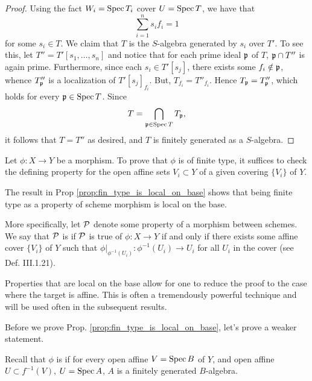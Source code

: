 \begin{proof}
Using the fact $W_i = \mathrm{Spec}\, T_i$ cover $U = \mathrm{Spec}\, T$, we have that
\[
\sum_{i = 1}^n s_if_i = 1
\]
for some $s_i \in T$. We claim that $T$ is the $S$-algebra 
generated by $s_i$ over $T'$. To see this, let $T'' = T'[s_1, 
\dots,s_n]$ and notice that for each prime ideal $\mathfrak{p}$ of 
$T$, $\mathfrak{p} \cap T''$ is again prime. Furthermore, since 
each $s_i \in T'[s_j]$, there exists some $f_i \notin \mathfrak{p}$, 
whence $T''_{\mathfrak{p}}$ is a localization of $T'[s_j]_{f_i}$. 
But, $T_{f_i} = T''_{f_i}$. Hence $T_{\mathfrak{p}} = T''_{\mathfrak{p}}$,
which holds for every $\mathfrak{p} \in \mathrm{Spec}\, T$. Since 
\[
T = \bigcap_{\mathfrak{p} \in \mathrm{Spec}\, T} T_{\mathfrak{p}},
\] 
it follows that $T = T''$ as desired, and $T$ is finitely 
generated as a $S$-algebra.
\end{proof}

\begin{prop}
\label{prop:fin_type_is_local_on_base}
Let $\phi: X \to Y$ be a morphism. To prove that $\phi$ is of 
finite type, it suffices to check the defining property for the 
open affine sets $V_i \subset Y$ of a given covering $\{V_i\}$ of 
$Y$.
\end{prop}

\begin{rmk}
The result in Prop \ref{prop:fin_type_is_local_on_base} shows
that being finite type as a property of scheme morphism is local
on the base. 

More specifically, let $\mathcal{P}$ denote some property of a 
morphism between schemes. We say that $\mathcal{P}$ is 
 if $\mathcal{P}$ is 
true of $\phi : X \to Y$ if and only if there exists some affine 
cover $\{V_i\}$ of $Y$ such that $\phi|_{\phi^{-1}(U_i)}: 
\phi^{-1}(U_i) \to U_i$ for all $U_i$ in the cover (see \cite{Liu}
Def. III.1.21). 

Properties that are local on the base allow for one to reduce
the proof to the case where the target is affine. This is often
a tremendously powerful technique and will be used often in the
subsequent results.
\end{rmk}

Before we prove Prop. \ref{prop:fin_type_is_local_on_base}, let's
prove a weaker statement.

\begin{defn}
Recall that $\phi$ is  if for every open affine $V = \mathrm{Spec}\, B$ of $Y$, 
and open affine $U \subset f^{-1}(V)$, $U = \mathrm{Spec}\, A$, $A$ is a
finitely generated $B$-algebra.
\end{defn}

